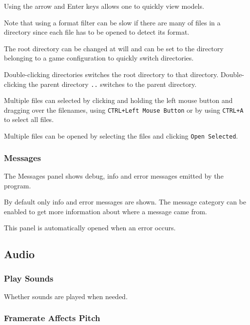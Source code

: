 \documentclass[10pt, a4paper, titlepage, oneside]{article}
\newcommand{\code}[1]{\mbox{\texttt{#1}}}
\begin{document}
Using the arrow and Enter keys allows one to quickly view models.

\vspace{\baselineskip}
Note that using a format filter can be slow if there are many of files in a directory since each file has to be opened to detect its format.

\vspace{\baselineskip}
The root directory can be changed at will and can be set to the directory belonging to a game configuration to quickly switch directories.

Double-clicking directories switches the root directory to that directory. Double-clicking the parent directory \code{..} switches to the parent directory.

\vspace{\baselineskip}
Multiple files can selected by clicking and holding the left mouse button and dragging over the filenames, using \code{CTRL+Left Mouse Button} or by using \code{CTRL+A} to select all files.

Multiple files can be opened by selecting the files and clicking \code{Open Selected}.

\subsubsection{Messages}

The Messages panel shows debug, info and error messages emitted by the program.

By default only info and error messages are shown. The message category can be enabled to get more information about where a message came from.

This panel is automatically opened when an error occurs.

\newpage

\subsection{Audio}

\subsubsection{Play Sounds}

Whether sounds are played when needed.

\subsubsection{Framerate Affects Pitch}
\end{document}
